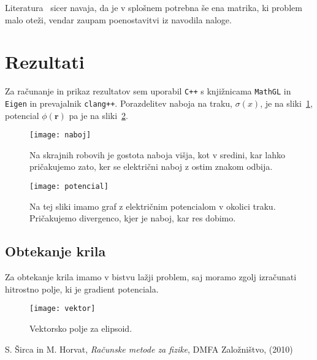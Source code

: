 \documentclass[a4 paper, 12pt]{article}
\renewcommand{\r}{
	\ensuremath{\mathbf{r}}
}
\begin{document}
Literatura~\cite[str.~659]{sirca} sicer navaja, da je v splo\v snem potrebna \v se ena matrika, ki problem malo
ote\v zi, vendar zaupam poenostavitvi iz navodila naloge.
\section{Rezultati}

Za ra\v cunanje in prikaz rezultatov sem uporabil {\tt C++} s knji\v znicama {\tt MathGL} in {\tt Eigen} in
prevajalnik {\tt clang++}. Porazdelitev naboja na traku, $\sigma(x)$, je na sliki~\ref{gr1}, potencial $\phi(\r)$ pa je
na sliki~\ref{gr2}.

\begin{figure}[H]\centering
	\texttt{[image: naboj]}
	\caption{Na skrajnih robovih je gostota naboja vi\v sja, kot v sredini, kar lahko
		pri\v cakujemo zato, ker se elektri\v cni naboj z ostim znakom odbija.}
	\label{gr1}
\end{figure}

\begin{figure}[H]\centering
	\texttt{[image: potencial]}
	\caption{Na tej sliki imamo graf z elektri\v cnim potencialom v okolici traku. Pri\v cakujemo
		divergenco, kjer je naboj, kar res dobimo.}
	\label{gr2}
\end{figure}

\subsection{Obtekanje krila}

Za obtekanje krila imamo v bistvu la\v zji problem, saj moramo zgolj izra\v cunati hitrostno polje, ki je
gradient potenciala.

\begin{figure}[H]\centering
	\texttt{[image: vektor]}
	\caption{Vektorsko polje za elipsoid.}
	\label{gr3}
\end{figure}

\begin{thebibliography}{9}
		S. \v Sirca in M. Horvat,
		{\em Ra\v cunske metode za fizike},
		DMFA Zalo\v zni\v stvo,
		(2010)
\end{thebibliography}
\end{document}

